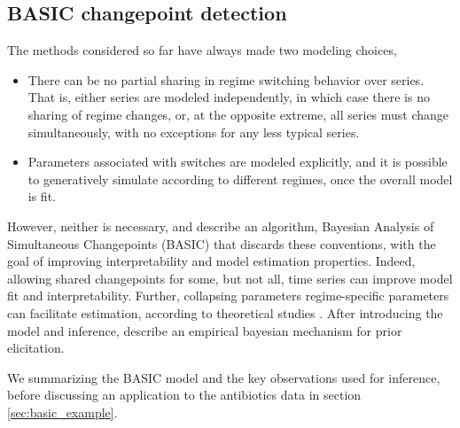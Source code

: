 \documentclass{article}
\begin{document}


\subsection{BASIC changepoint detection}

The methods considered so far have always made two modeling choices,
\begin{itemize}
\item There can be no partial sharing in regime switching behavior over series.
  That is, either series are modeled independently, in which case there is no
  sharing of regime changes, or, at the opposite extreme, all series must change
  simultaneously, with no exceptions for any less typical series.
\item Parameters associated with switches are modeled explicitly, and it is
  possible to generatively simulate according to different regimes, once the
  overall model is fit.
\end{itemize}

However, neither is necessary, and \cite{fan2015empirical} describe an
algorithm, Bayesian Analysis of Simultaneous Changepoints (BASIC) that discards
these conventions, with the goal of improving interpretability and model
estimation properties. Indeed, allowing shared changepoints for some, but not
all, time series can improve model fit and interpretability. Further, collapsing
parameters regime-specific parameters can facilitate estimation, according to
theoretical studies \citep{liu1994collapsed}. After introducing the model and
inference, \cite{fan2015empirical} describe an empirical bayesian mechanism for
prior elicitation.

We summarizing the BASIC model and the key observations used for inference,
before discussing an application to the antibiotics data in section
\ref{sec:basic_example}.
\end{document}
